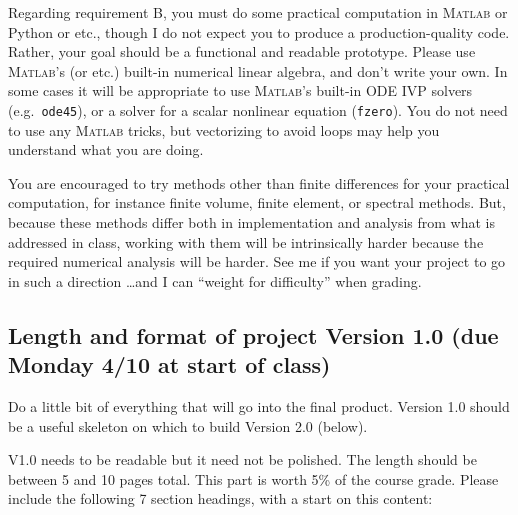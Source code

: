 \documentclass[11pt]{amsart}
\newcommand{\Matlab}{\textsc{Matlab}\xspace}
\begin{document}
Regarding requirement B, you must do some practical computation in \Matlab or Python or etc., though I do not expect you to produce a production-quality code.  Rather, your goal should be a functional and readable prototype.  Please use \Matlab's (or etc.) built-in numerical linear algebra, and don't write your own.  In some cases it will be appropriate to use \Matlab's built-in ODE IVP solvers (e.g.~\texttt{ode45}), or a solver for a scalar nonlinear equation (\texttt{fzero}).  You do not need to use any \Matlab tricks, but vectorizing to avoid loops may help you understand what you are doing.

You are encouraged to try methods other than finite differences for your practical computation, for instance finite volume, finite element, or spectral methods.  But, because these methods differ both in implementation and analysis from what is addressed in class, working with them will be intrinsically harder because the required numerical analysis will be harder.  See me if you want your project to go in such a direction \dots and I can ``weight for difficulty'' when grading.

\subsection*{Length and format of project Version 1.0 (due Monday 4/10 at start of class)}  Do a little bit of everything that will go into the final product.  Version 1.0 should be a useful skeleton on which to build Version 2.0 (below).

V1.0 needs to be readable but it need not be polished.  The length should be between 5 and 10 pages total.  This part is worth 5\% of the course grade.  Please include the following 7 section headings, with a start on this content:
\end{document}
